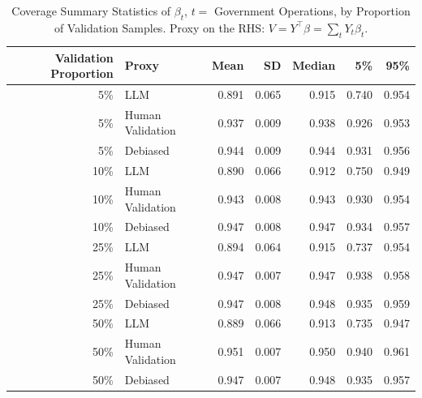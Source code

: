 \begin{table}

\caption{Coverage Summary Statistics of $\beta_{t}$, $t=$ Government Operations, by Proportion of Validation Samples.
      Proxy on the RHS: $V = Y^\top \beta = \sum_{t} Y_t \beta_t$.}
\centering
\begin{tabular}[t]{rlrrrrr}
\toprule
Validation Proportion & Proxy & Mean & SD & Median & 5\% & 95\%\\
\midrule
5\% & LLM & 0.891 & 0.065 & 0.915 & 0.740 & 0.954\\
5\% & Human Validation & 0.937 & 0.009 & 0.938 & 0.926 & 0.953\\
5\% & Debiased & 0.944 & 0.009 & 0.944 & 0.931 & 0.956\\
10\% & LLM & 0.890 & 0.066 & 0.912 & 0.750 & 0.949\\
10\% & Human Validation & 0.943 & 0.008 & 0.943 & 0.930 & 0.954\\
10\% & Debiased & 0.947 & 0.008 & 0.947 & 0.934 & 0.957\\
25\% & LLM & 0.894 & 0.064 & 0.915 & 0.737 & 0.954\\
25\% & Human Validation & 0.947 & 0.007 & 0.947 & 0.938 & 0.958\\
25\% & Debiased & 0.947 & 0.008 & 0.948 & 0.935 & 0.959\\
50\% & LLM & 0.889 & 0.066 & 0.913 & 0.735 & 0.947\\
50\% & Human Validation & 0.951 & 0.007 & 0.950 & 0.940 & 0.961\\
50\% & Debiased & 0.947 & 0.007 & 0.948 & 0.935 & 0.957\\
\bottomrule
\end{tabular}
\end{table}
